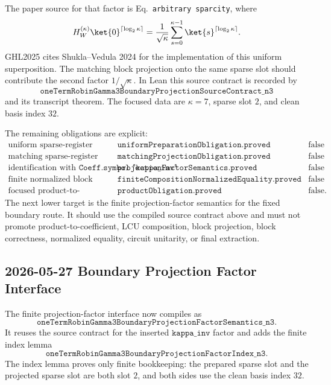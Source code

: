The paper source for that factor is Eq.~\texttt{arbitrary sparcity}, where
\[
  H_W^{(\kappa)}\ket{0}^{\lceil\log_2\kappa\rceil}
  =
  \frac{1}{\sqrt{\kappa}}
  \sum_{s=0}^{\kappa-1}\ket{s}^{\lceil\log_2\kappa\rceil}.
\]
GHL2025 cites Shukla--Vedula 2024 for the implementation of this uniform
superposition.  The matching block projection onto the same sparse slot should
contribute the second factor \(1/\sqrt{\kappa}\).  In Lean this source contract
is recorded by
\[
  \texttt{oneTermRobinGamma3BoundaryProjectionSourceContract\_n3}
\]
and its transcript theorem.  The focused data are \(\kappa=7\), sparse slot
\(2\), and clean basis index \(32\).

The remaining obligations are explicit:
\[
\begin{array}{lll}
\text{uniform sparse-register preparation} &
\texttt{uniformPreparationObligation.proved} & \text{false}\\
\text{matching sparse-register projection} &
\texttt{matchingProjectionObligation.proved} & \text{false}\\
\text{identification with }\texttt{Coeff.symbol "kappa\_inv"} &
\texttt{projectionFactorSemantics.proved} & \text{false}\\
\text{finite normalized block equality} &
\texttt{finiteCompositionNormalizedEquality.proved} & \text{false}\\
\text{focused product-to-coefficient theorem} &
\texttt{productObligation.proved} & \text{false}.
\end{array}
\]
The next lower target is the finite projection-factor semantics for the fixed
boundary route.  It should use the compiled source contract above and must not
promote product-to-coefficient, LCU composition, block projection, block
correctness, normalized equality, circuit unitarity, or final extraction.

\subsection{2026-05-27 Boundary Projection Factor Interface}

The finite projection-factor interface now compiles as
\[
  \texttt{oneTermRobinGamma3BoundaryProjectionFactorSemantics\_n3}.
\]
It reuses the source contract for the inserted
\(\texttt{kappa\_inv}\) factor and adds the finite index lemma
\[
  \texttt{oneTermRobinGamma3BoundaryProjectionFactorIndex\_n3}.
\]
The index lemma proves only finite bookkeeping: the prepared sparse slot and
the projected sparse slot are both slot \(2\), and both sides use the clean
basis index \(32\).

